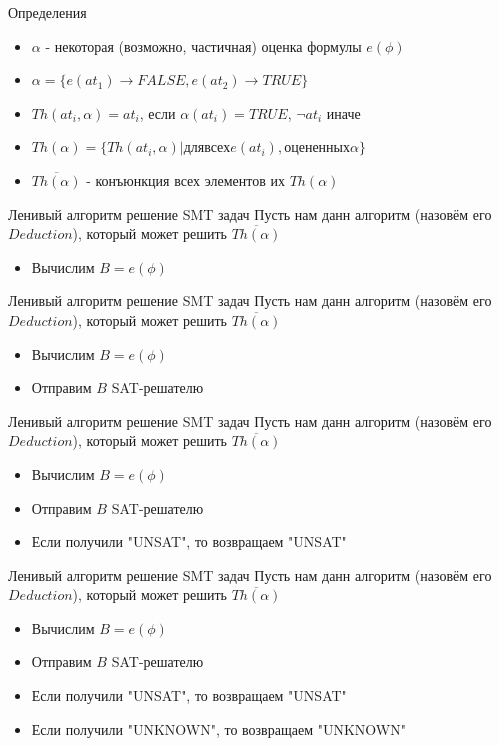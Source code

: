 \documentclass{beamer}
\begin{document}
\begin{frame}{Определения}
\begin{itemize}
\item $\alpha$ - некоторая (возможно, частичная) оценка формулы $e(\phi)$
\item $\alpha = \{e(at_1) \rightarrow FALSE, e(at_2) \rightarrow TRUE\}$
\item $Th(at_i, \alpha) = at_i$, если $\alpha(at_i) = TRUE$, $\lnot at_i$ иначе
\item $Th(\alpha) = \{Th(at_i, \alpha)| для всех e(at_i), оцененных \alpha\}$
\item $\overline{Th(\alpha)}$ - конъюнкция всех элементов их $Th(\alpha)$
\end{itemize}
\end{frame}

\begin{frame}{Ленивый алгоритм решение SMT задач}
Пусть нам данн алгоритм (назовём его $Deduction$), который может решить $\overline{Th(\alpha)}$
\begin{itemize}
\item Вычислим $B = e(\phi)$
\end{itemize}
\end{frame}

\begin{frame}{Ленивый алгоритм решение SMT задач}
Пусть нам данн алгоритм (назовём его $Deduction$), который может решить $\overline{Th(\alpha)}$
\begin{itemize}
\item Вычислим $B = e(\phi)$
\item Отправим $B$ SAT-решателю
\end{itemize}
\end{frame}

\begin{frame}{Ленивый алгоритм решение SMT задач}
Пусть нам данн алгоритм (назовём его $Deduction$), который может решить $\overline{Th(\alpha)}$
\begin{itemize}
\item Вычислим $B = e(\phi)$
\item Отправим $B$ SAT-решателю
\item Если получили "UNSAT", то возвращаем "UNSAT"
\end{itemize}
\end{frame}

\begin{frame}{Ленивый алгоритм решение SMT задач}
Пусть нам данн алгоритм (назовём его $Deduction$), который может решить $\overline{Th(\alpha)}$
\begin{itemize}
\item Вычислим $B = e(\phi)$
\item Отправим $B$ SAT-решателю
\item Если получили "UNSAT", то возвращаем "UNSAT"
\item Если получили "UNKNOWN", то возвращаем "UNKNOWN"
\end{itemize}
\end{frame}
\end{document}
